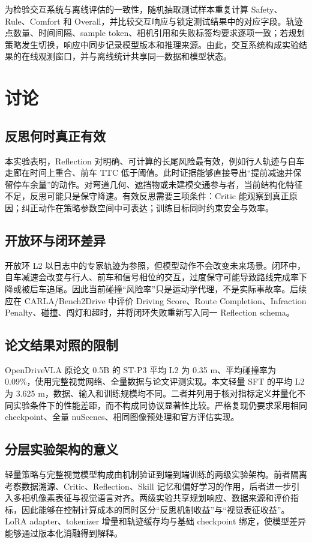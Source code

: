 \documentclass[UTF8,a4paper,12pt,fontset=fandol]{ctexart}
\begin{document}
为检验交互系统与离线评估的一致性，随机抽取测试样本重复计算 Safety、Rule、Comfort 和 Overall，并比较交互响应与锁定测试结果中的对应字段。轨迹点数量、时间间隔、sample token、相机引用和失败标签均要求逐项一致；若规划策略发生切换，响应中同步记录模型版本和推理来源。由此，交互系统构成实验结果的在线观测窗口，并与离线统计共享同一数据和模型状态。

\section{讨论}
\subsection{反思何时真正有效}
本实验表明，Reflection 对明确、可计算的长尾风险最有效，例如行人轨迹与自车走廊在时间上重合、前车 TTC 低于阈值。此时证据能够直接导出“提前减速并保留停车余量”的动作。对弯道几何、遮挡物或未建模交通参与者，当前结构化特征不足，反思可能只是保守降速。有效反思需要三项条件：Critic 能观察到真正原因；纠正动作在策略参数空间中可表达；训练目标同时约束安全与效率。

\subsection{开放环与闭环差异}
开放环 L2 以日志中的专家轨迹为参照，但模型动作不会改变未来场景。闭环中，自车减速会改变与行人、前车和信号相位的交互，过度保守可能导致路线完成率下降或被后车追尾。因此当前碰撞“风险率”只是运动学代理，不是实际事故率。后续应在 CARLA/Bench2Drive 中评价 Driving Score、Route Completion、Infraction Penalty、碰撞、闯灯和超时，并将闭环失败重新写入同一 Reflection schema。

\subsection{论文结果对照的限制}
OpenDriveVLA 原论文 0.5B 的 ST-P3 平均 L2 为 0.35 m、平均碰撞率为 0.09\%，使用完整视觉网络、全量数据与论文评测实现。本文轻量 SFT 的平均 L2 为 3.625 m，数据、输入和训练规模均不同。二者并列用于核对指标定义并量化不同实验条件下的性能差距，而不构成同协议显著性比较。严格复现仍要求采用相同 checkpoint、全量 nuScenes、相同图像预处理和官方评估实现。

\subsection{分层实验架构的意义}
轻量策略与完整视觉模型构成由机制验证到端到端训练的两级实验架构。前者隔离考察数据溯源、Critic、Reflection、Skill 记忆和偏好学习的作用，后者进一步引入多相机像素表征与视觉语言对齐。两级实验共享规划响应、数据来源和评价指标，因此能够在控制计算成本的同时区分“反思机制收益”与“视觉表征收益”。LoRA adapter、tokenizer 增量和轨迹缓存均与基础 checkpoint 绑定，使模型差异能够通过版本化消融得到解释。
\end{document}
